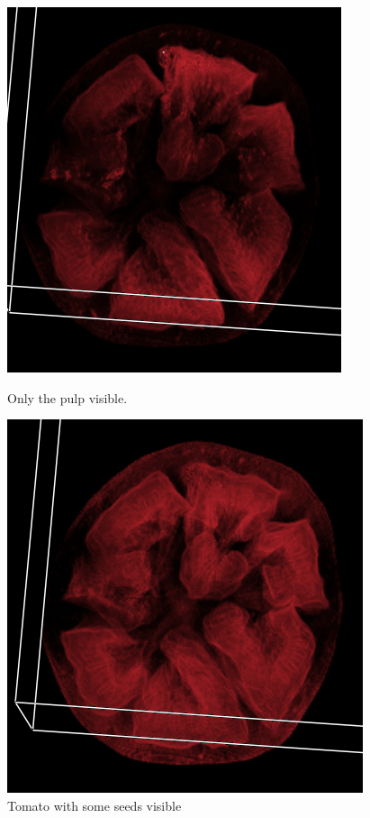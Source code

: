 \documentclass[a4paper,twoside,11pt]{article}
\begin{document}
\begin{figure}[htb]
  \includegraphics[width=\linewidth]{images/tomatoOp2}
  \caption{Only the pulp visible.}\label{tomatoOp2}
\endminipage\hfill
{}%
  \includegraphics[width=\linewidth]{images/tomatoOp3}
  \caption{Tomato with some seeds visible}\label{tomatoOp3}
\endminipage
\end{figure}
\end{document}
